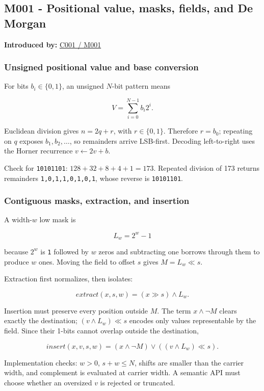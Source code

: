 \subsection{M001 - Positional value, masks, fields, and De Morgan}\label{m001---positional-value-masks-fields-and-de-morgan}

\textbf{Introduced by:} \hyperref[01-foundations-i-ch001]{C001 / M001}

\subsubsection{Unsigned positional value and base conversion}\label{unsigned-positional-value-and-base-conversion}

For bits \(b_i\in\{0,1\}\), an unsigned \(N\)-bit pattern means

\[
V=\sum_{i=0}^{N-1}b_i2^i.
\]

Euclidean division gives \(n=2q+r\), with \(r\in\{0,1\}\). Therefore \(r=b_0\); repeating on \(q\) exposes \(b_1,b_2,\ldots\), so remainders arrive LSB-first. Decoding left-to-right uses the Horner recurrence \(v\leftarrow2v+b\).

Check for \texttt{10101101}: \(128+32+8+4+1=173\). Repeated division of 173 returns remainders \texttt{1,0,1,1,0,1,0,1}, whose reverse is \texttt{10101101}.

\subsubsection{Contiguous masks, extraction, and insertion}\label{contiguous-masks-extraction-and-insertion}

A width-\(w\) low mask is

\[
L_w=2^w-1
\]

because \(2^w\) is \texttt{1} followed by \(w\) zeros and subtracting one borrows through them to produce \(w\) ones. Moving the field to offset \(s\) gives \(M=L_w\ll s\).

Extraction first normalizes, then isolates:

\[
extract(x,s,w)=(x\gg s)\land L_w.
\]

Insertion must preserve every position outside \(M\). The term \(x\land\neg M\) clears exactly the destination; \((v\land L_w)\ll s\) encodes only values representable by the field. Since their 1-bits cannot overlap outside the destination,

\[
insert(x,v,s,w)=(x\land\neg M)\lor((v\land L_w)\ll s).
\]

Implementation checks: \(w>0\), \(s+w\le N\), shifts are smaller than the carrier width, and complement is evaluated at carrier width. A semantic API must choose whether an oversized \(v\) is rejected or truncated.

